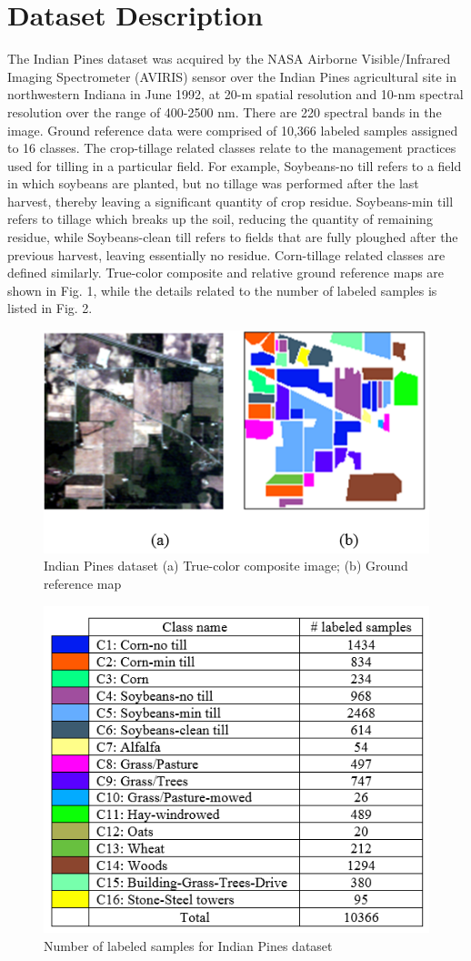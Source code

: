 \documentclass[11pt]{article}
\begin{document}
\section{Dataset Description}

The Indian Pines dataset was acquired by the NASA Airborne Visible/Infrared Imaging Spectrometer (AVIRIS) sensor over the Indian Pines agricultural site in northwestern Indiana in June 1992, at 20-m spatial resolution and 10-nm spectral resolution over the range of 400-2500 nm. There are 220 spectral bands in the image. Ground reference data were comprised of 10,366 labeled samples assigned to 16 classes.
The crop-tillage related classes relate to the management practices used for tilling in a particular field. For example, Soybeans-no till refers to a field in which soybeans are planted, but no tillage was performed after the last harvest, thereby leaving a significant quantity of crop residue. Soybeans-min till refers to tillage which breaks up the soil, reducing the quantity of remaining residue, while Soybeans-clean till refers to fields that are fully ploughed after the previous harvest, leaving essentially no residue. Corn-tillage related classes are defined similarly. True-color composite and relative ground reference maps are shown in Fig. 1, while the details related to the number of labeled samples is listed in Fig. 2.

\begin{figure}[ht]
\centering
\includegraphics[width=0.7\linewidth]{pic}
\caption{Indian Pines dataset (a) True-color composite image; (b) Ground reference map}
\label{fig:pic}
\end{figure}

\begin{figure}[ht]
\centering
\includegraphics[width=0.7\linewidth]{table}
\caption{Number of labeled samples for Indian Pines dataset}
\label{fig:table}
\end{figure}
\end{document}
